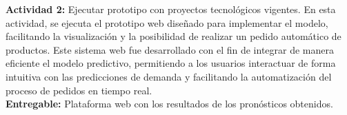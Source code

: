 		\textbf{Actividad 2: } Ejecutar prototipo con proyectos tecnológicos vigentes.
		En esta actividad, se ejecuta el prototipo web diseñado para implementar el modelo, facilitando la visualización y la posibilidad de realizar un pedido automático de productos. Este sistema web fue desarrollado con el fin de integrar de manera eficiente el modelo predictivo, permitiendo a los usuarios interactuar de forma intuitiva con las predicciones de demanda y facilitando la automatización del proceso de pedidos en tiempo real.\\
		\textbf{Entregable: } Plataforma web con los resultados de los pronósticos obtenidos.
		
		
		
		
		
		
		
		




